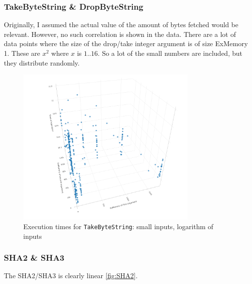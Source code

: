 \documentclass[a4paper]{article}
\begin{document}
\subsubsection*{TakeByteString \& DropByteString}

Originally, I assumed the actual value of the amount of bytes fetched would be
relevant. However, no such correlation is shown in the data. There are a lot of
data points where the size of the drop/take integer argument is of size ExMemory
1. These are $x^2$ where $x$ is $1..16$. So a lot of the small numbers are
included, but they distribute randomly.

\begin{figure}
\centering
  \includegraphics[width=0.8\textwidth]{figures/TakeByteString.png}
  \caption{Execution times for \texttt{TakeByteString}: small inputs, logarithm of inputs}
  \label{fig:TakeByteString}
\end{figure}

\subsubsection*{SHA2 \& SHA3}

The SHA2/SHA3 is clearly linear \ref{fig:SHA2}.
\end{document}
